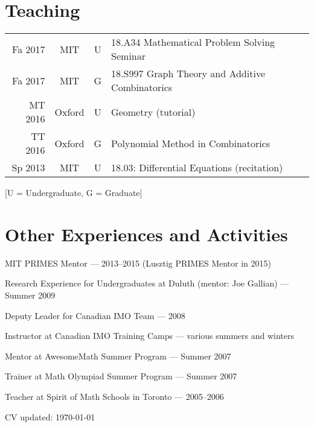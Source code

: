 \documentclass[11pt]{amsart}
\newcommand{\rightloc}[1]{\hfill {\raggedright #1}}
\begin{document}
%
%
%



\section*{Teaching}
\begin{longtable}[l]{rccl}
	Fa 2017 & MIT & U & 18.A34 Mathematical Problem Solving Seminar \\
	Fa 2017 & MIT & G & 18.S997 Graph Theory and Additive Combinatorics \\
	MT 2016 & Oxford & U & Geometry (tutorial) \\
	TT 2016 & Oxford & G & Polynomial Method in Combinatorics \\
	Sp 2013 & MIT & U & 18.03: Differential Equations (recitation)
\end{longtable}

{\footnotesize [U = Undergraduate, G = Graduate]}


\section*{Other Experiences and Activities}

MIT PRIMES Mentor --- 2013--2015 (Lusztig PRIMES Mentor in 2015)

Research Experience for Undergraduates at Duluth (mentor: Joe Gallian) --- Summer 2009

Deputy Leader for Canadian IMO Team --- 2008

Instructor at Canadian IMO Training Camps --- various summers and winters

Mentor at AwesomeMath Summer Program --- Summer 2007

Trainer at Math Olympiad Summer Program --- Summer 2007

Teacher at Spirit of Math Schools in Toronto --- 2005--2006

\vspace{\fill}

{\hfill \footnotesize CV updated: \today}
\end{document}
